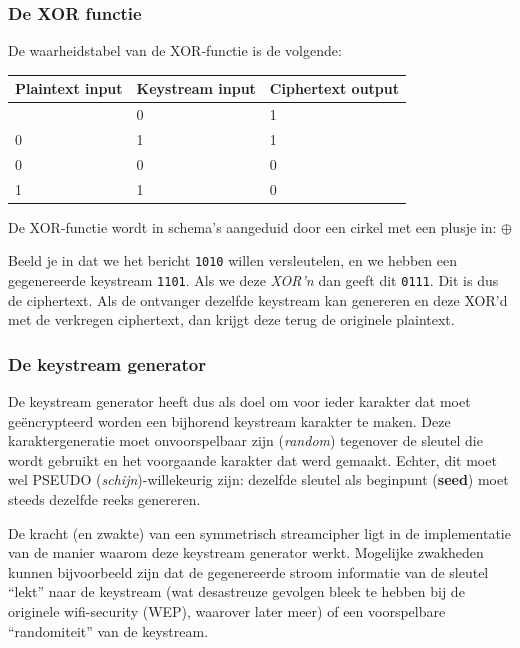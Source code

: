 \documentclass[
  10pt,
  dutch,
  paper=a4,
  ,captions=tableheading
]{scrbook}
\begin{document}
\subsubsection{De XOR functie}\label{de-xor-functie}

De waarheidstabel van de XOR-functie is de volgende:

{\def\LTcaptype{none} %
\begin{longtable}[]{@{}lll@{}}
\toprule\noalign{}
Plaintext input & Keystream input & Ciphertext output \\
\midrule\noalign{}
\endhead
\bottomrule\noalign{}
\endlastfoot
1 & 0 & 1 \\
0 & 1 & 1 \\
0 & 0 & 0 \\
1 & 1 & 0 \\
\end{longtable}
}

De XOR-functie wordt in schema's aangeduid door een cirkel met een
plusje in: \(\oplus\)

Beeld je in dat we het bericht \texttt{1010} willen versleutelen, en we
hebben een gegenereerde keystream \texttt{1101}. Als we deze
\emph{XOR'n} dan geeft dit \texttt{0111}. Dit is dus de ciphertext. Als
de ontvanger dezelfde keystream kan genereren en deze XOR'd met de
verkregen ciphertext, dan krijgt deze terug de originele plaintext.

\subsubsection{De keystream generator}\label{de-keystream-generator}

De keystream generator heeft dus als doel om voor ieder karakter dat
moet geëncrypteerd worden een bijhorend keystream karakter te maken.
Deze karaktergeneratie moet onvoorspelbaar zijn (\emph{random})
tegenover de sleutel die wordt gebruikt en het voorgaande karakter dat
werd gemaakt. Echter, dit moet wel PSEUDO (\emph{schijn})-willekeurig
zijn: dezelfde sleutel als beginpunt (\textbf{seed}) moet steeds
dezelfde reeks genereren.

De kracht (en zwakte) van een symmetrisch streamcipher ligt in de
implementatie van de manier waarom deze keystream generator werkt.
Mogelijke zwakheden kunnen bijvoorbeeld zijn dat de gegenereerde stroom
informatie van de sleutel ``lekt'' naar de keystream (wat desastreuze
gevolgen bleek te hebben bij de originele wifi-security (WEP), waarover
later meer) of een voorspelbare ``randomiteit'' van de keystream.
\end{document}
